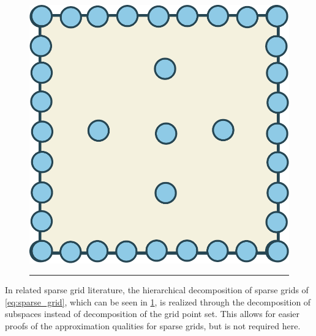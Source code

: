 \documentclass[
  a4paper,  %
  twoside,  %
  bibliography=totoc,
  headsepline,
  cleardoublepage=empty,
  parskip=half,
  draft=false
]{scrbook}
\newcommand{\delimit}{{\color{charcoal}\noindent\rule{\textwidth}{1pt}}}
\begin{document}
\begin{mdframed}[style=style]
\begin{figure}[H]
\begin{minipage}{0.26\textwidth}
\vspace{4.5mm}
  \includegraphics[width=.8\linewidth]{graphics/sparse_grid}
    \end{minipage}
    
\vspace{2.5mm}
\delimit

\label{fig:grid_construction}
\end{figure}
\end{mdframed}

In related sparse grid literature, the hierarchical decomposition of sparse grids of \cref{eq:sparse_grid}, which can be seen in \cref{fig:grid_construction}, is realized through the decomposition of subspaces instead of decomposition of the grid point set.
This allows for easier proofs of the approximation qualities for sparse grids, but is not required here.
\end{document}
